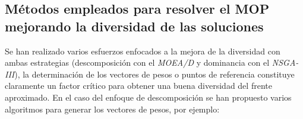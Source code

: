 \documentclass[letterpaper,10pt]{article}
\begin{document}
\subsection{Métodos empleados para resolver el MOP mejorando la diversidad de las soluciones}

Se han realizado varios esfuerzos enfocados a la mejora de la diversidad con ambas estrategias (descomposición con el \emph{MOEA/D} y dominancia con el \emph{NSGA-III}), la determinación de los vectores de pesos o puntos de referencia constituye claramente un factor crítico para obtener una buena diversidad del frente aproximado. En el caso del enfoque de descomposición se han propuesto varios algoritmos para generar los vectores de pesos, por ejemplo:
\newline
% 
\end{document}
